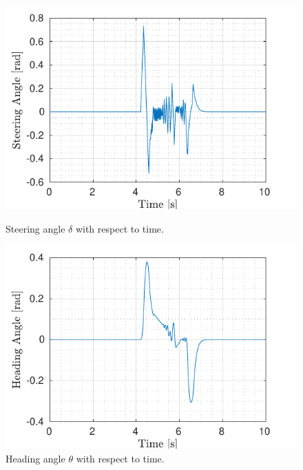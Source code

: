 \documentclass[conference, 11pt]{IEEEtran}
\begin{document}
	\begin{figure}[!b]
		\vspace{-1.2em}
		\centering
	\begin{minipage}[t]{\columnwidth}
	\includegraphics[width=1.1\columnwidth,height=0.5\columnwidth]{../../MATLAB/three_obstacles_no_overtaking/figure/SteeringAngleVsTime.pdf}
	\vspace{-22pt}
	\caption{Steering angle $\delta$ with respect to time.}
	\label{fig:delta_braking}
	\end{minipage}
	\begin{minipage}[t]{\columnwidth}
	\includegraphics[width=1.1\columnwidth,height=0.5\columnwidth]{../../MATLAB/three_obstacles_no_overtaking/figure/HeadingAngleVsTime.pdf}
	\vspace{-22pt}
	\caption{Heading angle $\theta$ with respect to time.}
	\label{fig:theta_braking}
	\end{minipage}
\end{figure}
\end{document}
